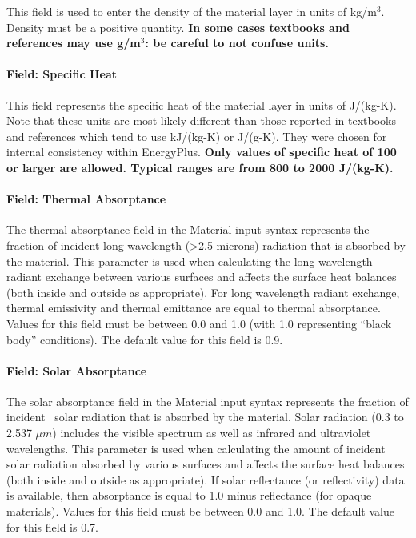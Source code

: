 This field is used to enter the density of the material layer in units of kg/m\(^{3}\). Density must be a positive quantity. \textbf{In some cases textbooks and references may use g/m\(^{3}\): be careful to not confuse units.}

\paragraph{Field: Specific Heat}\label{field-specific-heat}

This field represents the specific heat of the material layer in units of J/(kg-K). Note that these units are most likely different than those reported in textbooks and references which tend to use kJ/(kg-K) or J/(g-K). They were chosen for internal consistency within EnergyPlus. \textbf{Only values of specific heat of 100 or larger are allowed. Typical ranges are from 800 to 2000 J/(kg-K).}

\paragraph{Field: Thermal Absorptance}\label{field-thermal-absorptance}

The thermal absorptance field in the Material input syntax represents the fraction of incident long wavelength (>2.5 microns) radiation that is absorbed by the material. This parameter is used when calculating the long wavelength radiant exchange between various surfaces and affects the surface heat balances (both inside and outside as appropriate). For long wavelength radiant exchange, thermal emissivity and thermal emittance are equal to thermal absorptance. Values for this field must be between 0.0 and 1.0 (with 1.0 representing ``black body'' conditions). The default value for this field is 0.9.

\paragraph{Field: Solar Absorptance}\label{field-solar-absorptance}

The solar absorptance field in the Material input syntax represents the fraction of incident~ solar radiation that is absorbed by the material. Solar radiation (0.3 to 2.537 $\mu{}m$) includes the visible spectrum as well as infrared and ultraviolet wavelengths. This parameter is used when calculating the amount of incident solar radiation absorbed by various surfaces and affects the surface heat balances (both inside and outside as appropriate). If solar reflectance (or reflectivity) data is available, then absorptance is equal to 1.0 minus reflectance (for opaque materials). Values for this field must be between 0.0 and 1.0. The default value for this field is 0.7.

